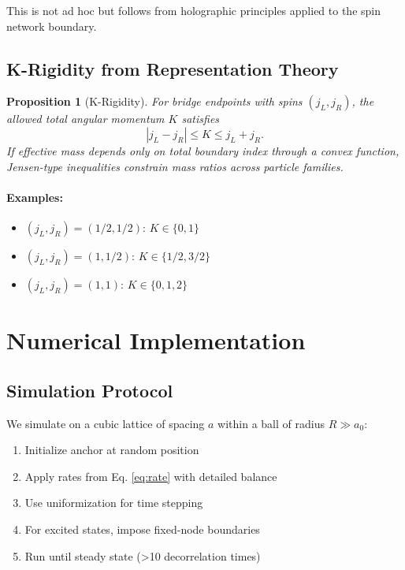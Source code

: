 \documentclass[11pt]{article}
\theoremstyle{plain}
\newtheorem{proposition}[theorem]{Proposition}
\theoremstyle{definition}
\begin{document}
This is not ad hoc but follows from holographic principles applied to the spin network boundary.

\subsection{K-Rigidity from Representation Theory}

\begin{proposition}[K-Rigidity]
  For bridge endpoints with spins $(j_L, j_R)$, the allowed total angular momentum $K$ satisfies
  \begin{equation}
    |j_L - j_R| \leq K \leq j_L + j_R.
  \end{equation}
  If effective mass depends only on total boundary index through a convex function, Jensen-type inequalities constrain mass ratios across particle families.
\end{proposition}

\paragraph{Examples:}
\begin{itemize}
  \item $(j_L, j_R) = (1/2, 1/2)$: $K \in \{0, 1\}$
  \item $(j_L, j_R) = (1, 1/2)$: $K \in \{1/2, 3/2\}$
  \item $(j_L, j_R) = (1, 1)$: $K \in \{0, 1, 2\}$
\end{itemize}

\section{Numerical Implementation}
\label{sec:numerics}

\subsection{Simulation Protocol}

We simulate on a cubic lattice of spacing $a$ within a ball of radius $R \gg a_0$:
\begin{enumerate}
  \item Initialize anchor at random position
  \item Apply rates from Eq. \eqref{eq:rate} with detailed balance
  \item Use uniformization for time stepping
  \item For excited states, impose fixed-node boundaries
  \item Run until steady state (>10 decorrelation times)
\end{enumerate}
\end{document}
